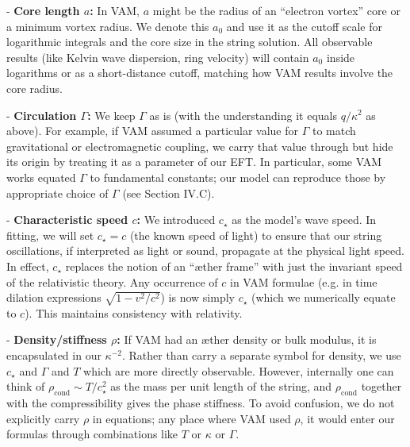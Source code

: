 \documentclass[12pt]{article}
\begin{document}
- \textbf{Core length $a$:} In VAM, $a$ might be the radius of an “electron vortex” core or a minimum vortex radius. We denote this $a_0$ and use it as the cutoff scale for logarithmic integrals and the core size in the string solution. All observable results (like Kelvin wave dispersion, ring velocity) will contain $a_0$ inside logarithms or as a short-distance cutoff, matching how VAM results involve the core radius.

- \textbf{Circulation $\Gamma$:} We keep $\Gamma$ as is (with the understanding it equals $q/\kappa^2$ as above). For example, if VAM assumed a particular value for $\Gamma$ to match gravitational or electromagnetic coupling, we carry that value through but hide its origin by treating it as a parameter of our EFT. In particular, some VAM works equated $\Gamma$ to fundamental constants; our model can reproduce those by appropriate choice of $\Gamma$ (see Section IV.C).

- \textbf{Characteristic speed $c$:} We introduced $c_\star$ as the model’s wave speed. In fitting, we will set $c_\star = c$ (the known speed of light) to ensure that our string oscillations, if interpreted as light or sound, propagate at the physical light speed. In effect, $c_\star$ replaces the notion of an “æther frame” with just the invariant speed of the relativistic theory. Any occurrence of $c$ in VAM formulae (e.g. in time dilation expressions $\sqrt{1-v^2/c^2}$) is now simply $c_\star$ (which we numerically equate to $c$). This maintains consistency with relativity.

- \textbf{Density/stiffness $\rho$:} If VAM had an æther density or bulk modulus, it is encapsulated in our $\kappa^{-2}$. Rather than carry a separate symbol for density, we use $c_\star$ and $\Gamma$ and $T$ which are more directly observable. However, internally one can think of $\rho_{\text{cond}} \sim T/c_\star^2$ as the mass per unit length of the string, and $\rho_{\text{cond}}$ together with the compressibility gives the phase stiffness. To avoid confusion, we do not explicitly carry $\rho$ in equations; any place where VAM used $\rho$, it would enter our formulas through combinations like $T$ or $\kappa$ or $\Gamma$.
\end{document}
